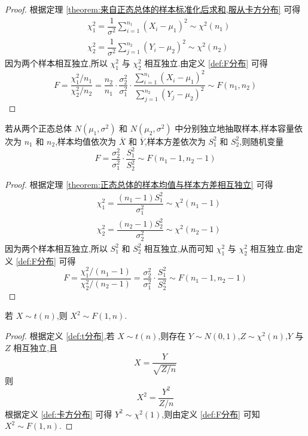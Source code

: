 \begin{proof}
    根据定理 \ref{theorem:来自正态总体的样本标准化后求和,服从卡方分布} 可得
    $$
    \begin{aligned}
        & \chi_1^2 = \dfrac{1}{\sigma^2} \sum_{i=1}^{n_1} (X_i - \mu_1)^2 \sim \chi^2(n_1) \\
        & \chi_2^2 = \dfrac{1}{\sigma^2} \sum_{j=1}^{n_2} (Y_i - \mu_2)^2 \sim \chi^2(n_2)
    \end{aligned}
    $$
    因为两个样本相互独立,所以 $\chi_1^2$ 与 $\chi_2^2$ 相互独立.由定义 \ref{def:F分布} 可得
    $$
    F = \dfrac{\chi_1^2 / n_1}{\chi_2^2 / n_2} = \dfrac{n_2}{n_1} \cdot \dfrac{\sigma_2^2}{\sigma_1^2} \cdot \dfrac{\displaystyle\sum_{i=1}^{n_1} (X_i - \mu_1)^2}{\displaystyle\sum_{j=1}^{n_2} (Y_j - \mu_2)^2} \sim F(n_1, n_2)
    $$
\end{proof}

\begin{theorem}
    若从两个正态总体 $N(\mu_1, \sigma^2)$ 和 $N(\mu_2, \sigma^2)$ 中分别独立地抽取样本,样本容量依次为 $n_1$ 和 $n_2$,样本均值依次为 $\overline{X}$ 和 $\overline{Y}$,样本方差依次为 $S_1^2$ 和 $S_2^2$,则随机变量
    $$
    F = \dfrac{\sigma_2^2}{\sigma_1^2} \cdot \dfrac{S_1^2}{S_2^2} \sim F(n_1 - 1, n_2 - 1)
    $$
\end{theorem}

\begin{proof}
    根据定理 \ref{theorem:正态总体的样本均值与样本方差相互独立} 可得
    $$
    \begin{aligned}
        & \chi_1^2 = \dfrac{(n_1 - 1) S_1^2}{\sigma_1^2} \sim \chi^2(n_1 - 1) \\
        & \chi_2^2 = \dfrac{(n_2 - 1) S_2^2}{\sigma_2^2} \sim \chi^2(n_2 - 1)
    \end{aligned}
    $$
    因为两个样本相互独立,所以 $S_1^2$ 和 $S_2^2$ 相互独立,从而可知 $\chi_1^2$ 与 $\chi_2^2$ 相互独立.由定义 \ref{def:F分布} 可得
    $$
    F = \dfrac{\chi_1^2 / (n_1 - 1)}{\chi_2^2 / (n_2 - 1)} = \dfrac{\sigma_2^2}{\sigma_1^2} \cdot \dfrac{S_1^2}{S_2^2} \sim F(n_1 - 1, n_2 - 1)
    $$
\end{proof}

\begin{conclusion}
    若 $X \sim t(n)$,则 $X^2 \sim F(1,n)$.
\end{conclusion}

\begin{proof}
    根据定义 \ref{def:t分布},若 $X \sim t(n)$,则存在 $Y \sim N(0,1)$,$Z \sim \chi^2(n)$,$Y$ 与 $Z$ 相互独立,且
    $$
    X = \dfrac{Y}{\sqrt{Z / n}}
    $$
    则
    $$
    X^2 = \dfrac{Y^2}{Z / n}
    $$
    根据定义 \ref{def:卡方分布} 可得 $Y^2 \sim \chi^2(1)$,则由定义 \ref{def:F分布} 可知 $X^2 \sim F(1,n)$.
\end{proof}